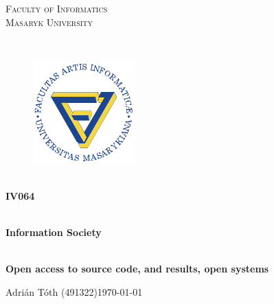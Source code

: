 \documentclass[11pt,a4paper]{article}
\theoremstyle{definition}
\begin{document}
\begin{titlepage}

    \begin{center}
        \vfill {%
            \Huge{%
                \textsc{%
                    Faculty of Informatics\\[3mm]%
                    Masaryk University%
                }%
            }%
        }%

        \hfill\\[15mm]

        \begin{figure}[!h]
            \centering
            \includegraphics[scale=3]{img/muni-fi-logo.pdf}
        \end{figure}

        \hfill\\[10mm]

        \Huge{
            \textbf{
                IV064
            }
        }

        \hfill\\[-10mm]

        \huge{
            \textbf{
                Information Society
            }
        }

        \hfill\\[10mm]

        \LARGE{
            \textbf{
                Open access to source code, and results, open systems
            }
        }
        \vfill

    \end{center}

        \Large{
            \noindent Adrián Tóth (491322)\hfill \today
        }

\end{titlepage}

\setlength{\parskip}{0pt}
    {
        \hypersetup{
            hidelinks=true
        }
        \tableofcontents
    }
\setlength{\parskip}{0pt}

\newpage
\end{document}
